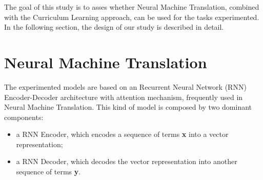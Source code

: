 
The goal of this study is to asses whether Neural Machine Translation, combined with the Curriculum Learning approach, 
can be used for the tasks experimented. In the following section, the design of our study is described in detail.


\section{Neural Machine Translation}
The experimented models are based on an Recurrent Neural Network (RNN) Encoder-Decoder
architecture with attention mechanism, frequently used in Neural Machine Translation. This kind of model is composed by two
dominant components:

\begin{itemize}
    \item a RNN Encoder, which encodes a sequence of terms \textbf{x} into a vector representation;
    \item a RNN Decoder, which decodes the vector representation into another sequence of terms \textbf{y}.
\end{itemize}

